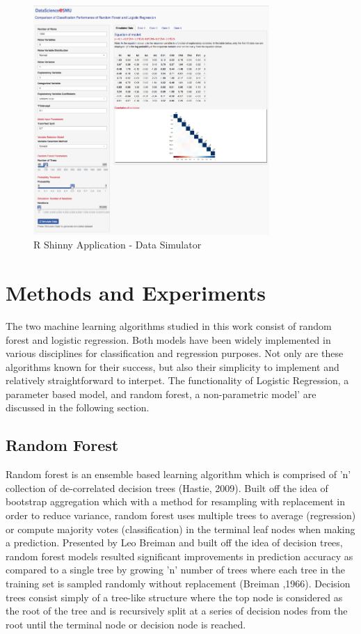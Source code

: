 \documentclass{llncs}
\begin{document}
\begin{figure}
\centering
\includegraphics[width=0.8\textwidth]{rshiny.png}
\caption{R Shinny Application - Data Simulator}
\end{figure}


\section{Methods and Experiments}

The two machine learning algorithms studied in this work consist of random forest and logistic regression. Both models have been widely implemented in various disciplines for classification and regression purposes. Not only are these algorithms known for their success, but also their simplicity to implement and relatively straightforward to interpet. The functionality of Logistic Regression, a parameter based model, and random forest, a non-parametric model' are discussed in the following section. 

\subsection{Random Forest}


Random forest is an ensemble based learning algorithm which is comprised of 'n' collection of de-correlated decision trees (Hastie, 2009). Built off the idea of bootstrap aggregation which with a method for resampling with replacement in order to reduce variance, random forest uses multiple trees to average (regression) or compute majority votes (classification) in the terminal leaf nodes when making a prediction. Presented by Leo Breiman and built off the idea of decision trees, random forest models resulted significant improvements in prediction accuracy as compared to a single tree by growing 'n' number of trees where each tree in the training set is sampled randomly without replacement (Breiman ,1966). Decision trees consist simply of a tree-like structure where the top node is considered as the root of the tree and is recursively split at a series of decision nodes from the root until the terminal node or decision node is reached. 
\end{document}
